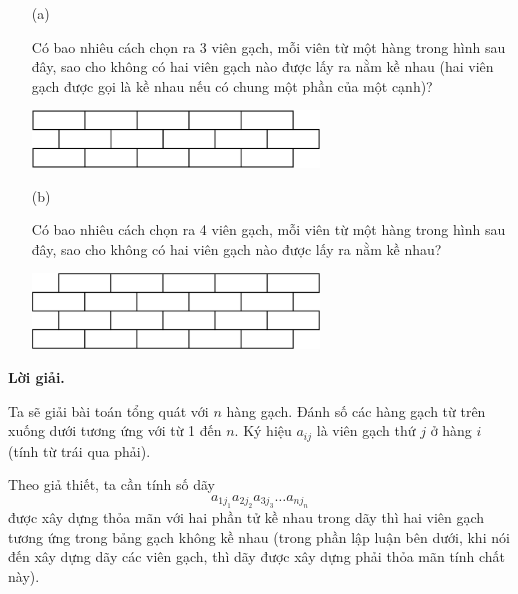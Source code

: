 \begin{tcolorbox}[title=\textbf{Bài toán B.4.},breakable]
    \begin{enumerate}
        \item[(a)] {Có bao nhiêu cách chọn ra 3 viên gạch, mỗi viên từ một hàng trong hình sau đây, sao cho không có hai viên gạch nào được lấy ra nằm kề nhau (hai viên gạch được gọi là kề nhau nếu có chung một phần của một cạnh)?
        
        \begin{center}
            \includegraphics[width=0.6\textwidth]{Figures/02.png}
        \end{center}}
        \item[(b)] {Có bao nhiêu cách chọn ra 4 viên gạch, mỗi viên từ một hàng trong hình sau đây, sao cho không có hai viên gạch nào được lấy ra nằm kề nhau?
        
        \begin{center}
            \includegraphics[width=0.6\textwidth]{Figures/03.png}
        \end{center}}
    \end{enumerate}
\end{tcolorbox}

\textbf{Lời giải. }

Ta sẽ giải bài toán tổng quát với $n$ hàng gạch. Đánh số các hàng gạch từ trên xuống dưới tương ứng với từ 1 đến $n$. Ký hiệu $a_{ij}$ là viên gạch thứ $j$ ở hàng $i$ (tính từ trái qua phải). 
        
Theo giả thiết, ta cần tính số dãy $$a_{1j_1}a_{2j_2}a_{3j_3}\ldots a_{nj_n}$$ được xây dựng thỏa mãn với hai phần tử kề nhau trong dãy thì hai viên gạch tương ứng trong bảng gạch không kề nhau (trong phần lập luận bên dưới, khi nói đến xây dựng dãy các viên gạch, thì dãy được xây dựng phải thỏa mãn tính chất này). 

